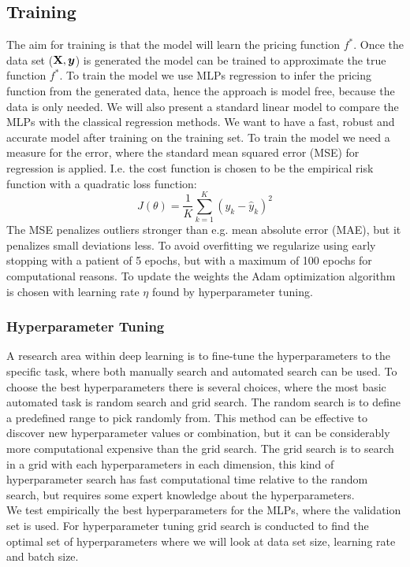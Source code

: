 \subsection{Training}\label{Training}
The aim for training is that the model will learn the pricing function $f^*$. Once the data set ($\mathbf{X}, \bm{y}$) is generated the model can be trained to approximate the true function $f^*$. To train the model we use MLPs regression to infer the pricing function from the generated data, hence the approach is model free, because the data is only needed. We will also present a standard linear model to compare the MLPs with the classical regression methods. We want to have a fast, robust and accurate model after training on the training set. To train the model we need a measure for the error, where the standard mean squared error (MSE) for regression is applied. I.e. the cost function is chosen to be the empirical risk function with a quadratic loss function:
$$J(\theta)= \frac{1}{K} \sum_{k=1}^{K}(y_k-\hat{y}_k)^2$$
The MSE penalizes outliers stronger than e.g. mean absolute error (MAE), but it penalizes small deviations less. To avoid overfitting we regularize using early stopping with a patient of 5 epochs, but with a maximum of 100 epochs for computational reasons. To update the weights the Adam optimization algorithm is chosen with learning rate $\eta$ found by hyperparameter tuning. \\

\subsubsection{Hyperparameter Tuning}
A research area within deep learning is to fine-tune the hyperparameters to the specific task, where both manually search and automated search can be used. To choose the best hyperparameters there is several choices, where the most basic automated task is random search and grid search. The random search is to define a predefined range to pick randomly from. This method can be effective to discover new hyperparameter values or combination, but it can be considerably more computational expensive than the grid search. The grid search is to search in a grid with each hyperparameters in each dimension, this kind of hyperparameter search has fast computational time relative to the random search, but requires some expert knowledge about the hyperparameters.\\

We test empirically the best hyperparameters for the MLPs, where the validation set is used. For hyperparameter tuning grid search is conducted to find the optimal set of hyperparameters where we will look at data set size, learning rate and batch size. \\

